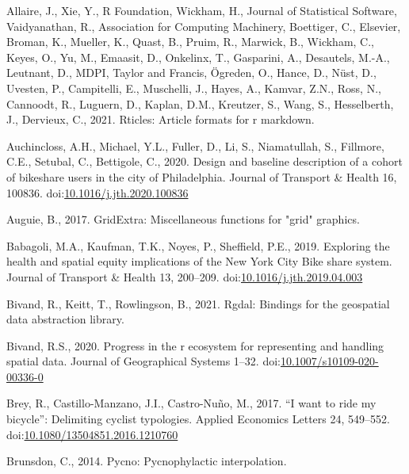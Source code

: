 \documentclass[]{elsarticle} %
\begin{document}
\hypertarget{refs}{}
\leavevmode\hypertarget{ref-R-rticles}{}%
Allaire, J., Xie, Y., R Foundation, Wickham, H., Journal of Statistical
Software, Vaidyanathan, R., Association for Computing Machinery,
Boettiger, C., Elsevier, Broman, K., Mueller, K., Quast, B., Pruim, R.,
Marwick, B., Wickham, C., Keyes, O., Yu, M., Emaasit, D., Onkelinx, T.,
Gasparini, A., Desautels, M.-A., Leutnant, D., MDPI, Taylor and Francis,
Ögreden, O., Hance, D., Nüst, D., Uvesten, P., Campitelli, E.,
Muschelli, J., Hayes, A., Kamvar, Z.N., Ross, N., Cannoodt, R., Luguern,
D., Kaplan, D.M., Kreutzer, S., Wang, S., Hesselberth, J., Dervieux, C.,
2021. Rticles: Article formats for r markdown.

\leavevmode\hypertarget{ref-auchinclossDesignBaselineDescription2020}{}%
Auchincloss, A.H., Michael, Y.L., Fuller, D., Li, S., Niamatullah, S.,
Fillmore, C.E., Setubal, C., Bettigole, C., 2020. Design and baseline
description of a cohort of bikeshare users in the city of Philadelphia.
Journal of Transport \& Health 16, 100836.
doi:\href{https://doi.org/10.1016/j.jth.2020.100836}{10.1016/j.jth.2020.100836}

\leavevmode\hypertarget{ref-R-gridExtra}{}%
Auguie, B., 2017. GridExtra: Miscellaneous functions for "grid"
graphics.

\leavevmode\hypertarget{ref-babagoliExploringHealthSpatial2019}{}%
Babagoli, M.A., Kaufman, T.K., Noyes, P., Sheffield, P.E., 2019.
Exploring the health and spatial equity implications of the New York
City Bike share system. Journal of Transport \& Health 13, 200--209.
doi:\href{https://doi.org/10.1016/j.jth.2019.04.003}{10.1016/j.jth.2019.04.003}

\leavevmode\hypertarget{ref-R-rgdal}{}%
Bivand, R., Keitt, T., Rowlingson, B., 2021. Rgdal: Bindings for the
geospatial data abstraction library.

\leavevmode\hypertarget{ref-bivand2020progress}{}%
Bivand, R.S., 2020. Progress in the r ecosystem for representing and
handling spatial data. Journal of Geographical Systems 1--32.
doi:\href{https://doi.org/10.1007/s10109-020-00336-0}{10.1007/s10109-020-00336-0}

\leavevmode\hypertarget{ref-breyWantRideMy2017}{}%
Brey, R., Castillo-Manzano, J.I., Castro-Nuño, M., 2017. ``I want to
ride my bicycle'': Delimiting cyclist typologies. Applied Economics
Letters 24, 549--552.
doi:\href{https://doi.org/10.1080/13504851.2016.1210760}{10.1080/13504851.2016.1210760}

\leavevmode\hypertarget{ref-R-pycno}{}%
Brunsdon, C., 2014. Pycno: Pycnophylactic interpolation.
\end{document}
